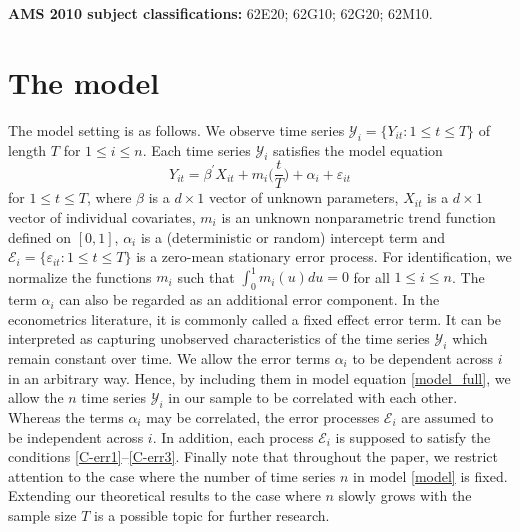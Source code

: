 \documentclass[a4paper,12pt]{article}
\begin{document}
\textbf{AMS 2010 subject classifications:} 62E20; 62G10; 62G20; 62M10. 

\vspace{-0.25cm}

\allowdisplaybreaks[1]


\section{The model}\label{sec-model}

The model setting is as follows. We observe time series $\mathcal{Y}_i = \{Y_{it}: 1 \le t \le T \}$ of length $T$ for $1 \le i \le n$. Each time series $\mathcal{Y}_i$ satisfies the model equation \begin{equation}\label{model_full}
Y_{it} = \beta^\prime X_{it} + m_i \Big( \frac{t}{T} \Big) + \alpha_i + \varepsilon_{it} 
\end{equation}
for $1 \le t \le T$, where $\beta$ is a $d \times 1$ vector of unknown parameters, $X_{it}$ is a $d\times 1$ vector of individual covariates, $m_i$ is an unknown nonparametric trend function defined on $[0,1]$, $\alpha_i$ is a (deterministic or random) intercept term and $\mathcal{E}_i = \{ \varepsilon_{it}: 1 \le t \le T \}$ is a zero-mean stationary error process. For identification, we normalize the functions $m_i$ such that $\int_0^1 m_i(u) du = 0$ for all $1 \le i \le n$. The term $\alpha_i$ can also be regarded as an additional error component. In the econometrics literature, it is commonly called a fixed effect error term. It can be interpreted as capturing unobserved characteristics of the time series $\mathcal{Y}_i$ which remain constant over time. We allow the error terms $\alpha_i$ to be dependent across $i$ in an arbitrary way. Hence, by including them in model equation \eqref{model_full}, we allow the $n$ time series $\mathcal{Y}_i$ in our sample to be correlated with each other. Whereas the terms $\alpha_i$ may be correlated, the error processes $\mathcal{E}_i$ are assumed to be independent across $i$. In addition, each process $\mathcal{E}_i$ is supposed to satisfy the conditions \ref{C-err1}--\ref{C-err3}. Finally note that throughout the paper, we restrict attention to the case where the number of time series $n$ in model \eqref{model} is fixed. Extending our theoretical results to the case where $n$ slowly grows with the sample size $T$ is a possible topic for further research.
\end{document}
